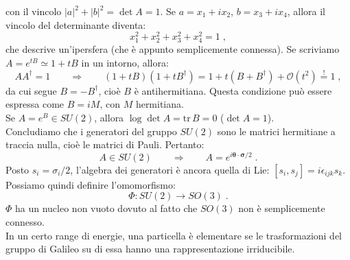 \documentclass[10pt,a4paper]{report}
\theoremstyle{definition}
\numberwithin{equation}{section}
\newcommand{\adj}[1]{#1^{\dagger}}
\newcommand{\tr}{\mathrm{tr}}
\begin{document}
con il vincolo $|a|^2+|b|^2=\det A=1$. Se $a=x_1+ix_2$, $b=x_3+ix_4$, allora il vincolo del determinante diventa:
\begin{equation}
x_1^2+x_2^2+x_3^2+x_4^2=1\;,
\end{equation}
che descrive un'ipersfera (che è appunto semplicemente connessa). Se scriviamo $A=e^{tB}\simeq 1+tB$ in un intorno, allora:
\begin{equation}
A\adj{A}=1\qquad \Longrightarrow \qquad (1+tB)(1+t\adj{B})=1+t(B+\adj{B})+\mathcal{O}(t^2)\stackrel{!}{=} 1\;,
\end{equation}
da cui segue $B=-\adj{B}$, cioè $B$ è antihermitiana. Questa condizione può essere espressa come $B=iM$, con $M$ hermitiana. \\
Se $A=e^B\in SU(2)$, allora $\log\det A=\tr\, B=0$ ($\det A=1$). \\
Concludiamo che i generatori del gruppo $SU(2)$ sono le matrici hermitiane a traccia nulla, cioè le matrici di Pauli. Pertanto:
\begin{equation}
A\in SU(2) \qquad \Longrightarrow \qquad A=e^{i\boldsymbol{\theta}\cdot \boldsymbol{\sigma}/2}\;.
\end{equation}
Posto $s_i=\sigma_i/2$, l'algebra dei generatori è ancora quella di Lie: $[s_i,s_j]=i\epsilon_{ijk}s_k$. Possiamo quindi definire l'omomorfismo:
\begin{equation}
\Phi: SU(2) \longrightarrow SO(3)\;.
\end{equation}
$\Phi$ ha un nucleo non vuoto dovuto al fatto che $SO(3)$ non è semplicemente connesso. \\
In un certo range di energie, una particella è elementare se le trasformazioni del gruppo di Galileo su di essa hanno una rappresentazione irriducibile. \\
\end{document}
